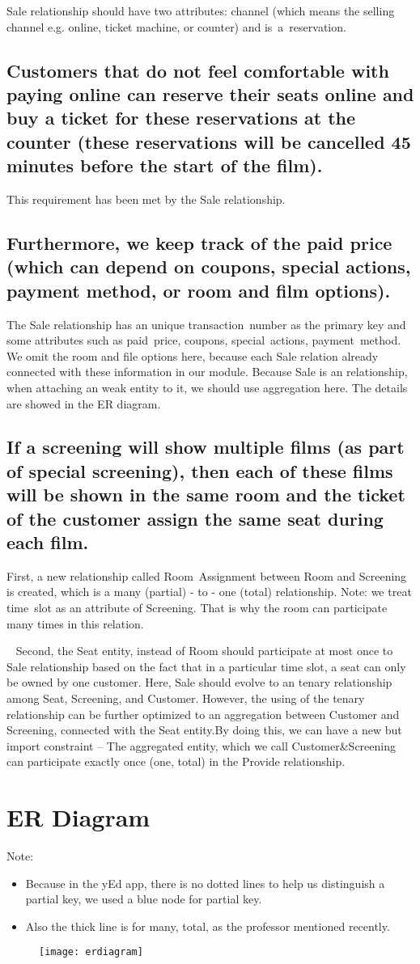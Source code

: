 \documentclass[11pt,fleqn]{exam}
\newcommand{\nn}{~\newline \noindent }
\newcommand{\mn}[1]{\mbox{\sf #1}}
\newcommand{\sbs}{\subsection*}
\begin{document}
	\mn{Sale} relationship should have two attributes: \mn{channel} (which means the selling channel e.g. online, ticket machine, or counter) and \mn{is a reservation}.
	\sbs{Customers that do not feel comfortable with paying online can reserve their seats online and buy a ticket for these reservations at the counter (these reservations will be cancelled 45 minutes before the start of the film).}
	This requirement has been met by the \mn{Sale} relationship.
	\sbs{Furthermore, we keep track of the paid price (which can depend on coupons, special actions, payment method, or room and film options).}
	The \mn{Sale} relationship has an unique \mn{transaction number} as the primary key and some attributes such as \mn{paid price}, \mn{coupons}, \mn{special actions}, \mn{payment method}. We omit the room and file options here, because each \mn{Sale} relation already connected with these information in our module. Because \mn{Sale} is an relationship, when attaching an weak entity to it, we should use aggregation here. The details are showed in the ER diagram.
	\sbs{If a screening will show multiple films (as part of special screening), then each of these films will be shown in the same room and the ticket of the customer assign the same seat during each film.}
	First, a new relationship called \mn{Room Assignment} between \mn{Room} and \mn{Screening} is created, which is a many (partial) - to - one (total) relationship. Note: we treat \mn{time slot} as an attribute of \mn{Screening}. That is why the room can participate many times in this relation.
	
	\nn
	Second, the \mn{Seat} entity, instead of \mn{Room} should participate at most once to \mn{Sale} relationship based on the fact that in a particular time slot, a seat can only be owned by one customer. Here, \mn{Sale} should evolve to an tenary relationship among \mn{Seat}, \mn{Screening}, and \mn{Customer}.  However, the using of the tenary relationship can be further optimized to an aggregation between \mn{Customer} and \mn{Screening}, connected with the \mn{Seat} entity.By doing this, we can have a new but import constraint -- The aggregated entity, which we call \mn{Customer\&Screening} can participate exactly once (one, total) in the \mn{Provide} relationship.
	
	\newpage
	\section*{ER Diagram}
	Note: 
	\begin{itemize}
	\item Because in the yEd app, there is no dotted lines to help us distinguish a partial key, we used a blue node for partial key.
	\item Also the thick line is for many, total, as the professor mentioned recently.
	\end{itemize}
	
	\begin{figure}[hbt!]
  	\centering
  	\texttt{[image: erdiagram]}
	\end{figure}
	
	
\end{document}
